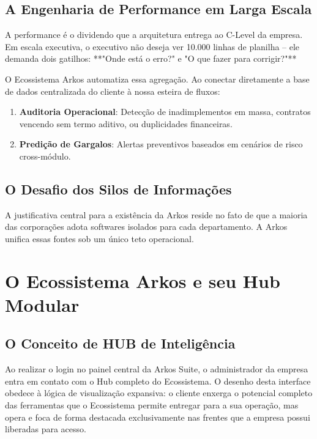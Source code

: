 \documentclass[12pt,a4paper,oneside]{report}
\begin{document}
\section{A Engenharia de Performance em Larga Escala}
A performance é o dividendo que a arquitetura entrega ao C-Level da empresa. Em escala executiva, o executivo não deseja ver 10.000 linhas de planilha – ele demanda dois gatilhos: **"Onde está o erro?" e "O que fazer para corrigir?"**

O Ecossistema Arkos automatiza essa agregação. Ao conectar diretamente a base de dados centralizada do cliente à nossa esteira de fluxos:
\begin{enumerate}
    \item \textbf{Auditoria Operacional}: Detecção de inadimplementos em massa, contratos vencendo sem termo aditivo, ou duplicidades financeiras.
    \item \textbf{Predição de Gargalos}: Alertas preventivos baseados em cenários de risco cross-módulo.
\end{enumerate}

\section{O Desafio dos Silos de Informações}
A justificativa central para a existência da Arkos reside no fato de que a maioria das corporações adota softwares isolados para cada departamento. A Arkos unifica essas fontes sob um único teto operacional.

\pagebreak

\chapter{O Ecossistema Arkos e seu Hub Modular}

\section{O Conceito de HUB de Inteligência}
Ao realizar o login no painel central da Arkos Suite, o administrador da empresa entra em contato com o Hub completo do Ecossistema. O desenho desta interface obedece à lógica de visualização expansiva: o cliente enxerga o potencial completo das ferramentas que o Ecossistema permite entregar para a sua operação, mas opera e foca de forma destacada exclusivamente nas frentes que a empresa possui liberadas para acesso.
\end{document}
